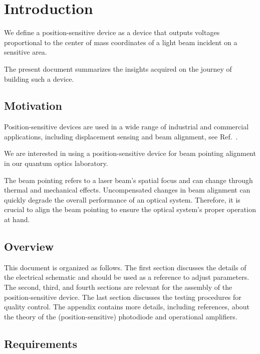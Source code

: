 \section{Introduction}

We define a position-sensitive device as a device that outputs voltages proportional to the center of mass coordinates of a light beam incident on a sensitive area.

The present document summarizes the insights acquired on the journey of building such a device.

\subsection{Motivation}

Position-sensitive devices are used in a wide range of industrial and commercial applications, including displacement sensing and beam alignment, see Ref.~\cite[p.~22]{Maekynen00}.

We are interested in using a position-sensitive device for beam pointing alignment in our quantum optics laboratory.

The beam pointing refers to a laser beam's spatial focus and can change through thermal and mechanical effects.
Uncompensated changes in beam alignment can quickly degrade the overall performance of an optical system.
Therefore, it is crucial to align the beam pointing to ensure the optical system's proper operation at hand.

\subsection{Overview}

This document is organized as follows. The first section discusses the details of the electrical schematic and should be used as a reference to adjust parameters.
 The second, third, and fourth sections are relevant for the assembly of the position-sensitive device.
The last section discusses the testing procedures for quality control.
The appendix contains more details, including references, about the theory of the (position-sensitive) photodiode and operational amplifiers.

\subsection{Requirements}

